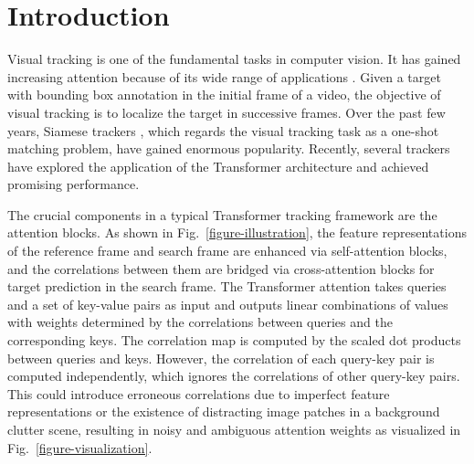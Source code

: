 \section{Introduction}
Visual tracking is one of the fundamental tasks in computer vision. It has gained increasing attention because of its wide range of applications \cite{marvasti2021deep,fiaz2019handcrafted}. Given a target with bounding box annotation in the initial frame of a video, the objective of visual tracking is to localize the target in successive frames. Over the past few years, Siamese trackers \cite{bertinetto2016fully,li2018high,li2019siamrpn++,zhang2020ocean}, which regards the visual tracking task as a one-shot matching problem, have gained enormous popularity. Recently, several trackers \cite{wang2021transformer,chen2021transformer,yu2021high,cao2021hift,yan2021learning,xing2022siamese} have explored the application of the Transformer \cite{vaswani2017attention} architecture and achieved promising performance.

The crucial components in a typical Transformer tracking framework \cite{wang2021transformer,chen2021transformer,yu2021high} are the attention blocks. As shown in Fig.~\ref{figure-illustration}, the feature representations of the reference frame and search frame are enhanced via self-attention blocks, and the correlations between them are bridged via cross-attention blocks for target prediction in the search frame. The Transformer attention \cite{vaswani2017attention} takes queries and a set of key-value pairs as input and outputs linear combinations of values with weights determined by the correlations between queries and the corresponding keys. The correlation map is computed by the scaled dot products between queries and keys. However, the correlation of each query-key pair is computed independently, which ignores the correlations of other query-key pairs. This could introduce erroneous correlations due to imperfect feature representations or the existence of distracting image patches in a background clutter scene, resulting in noisy and ambiguous attention weights as visualized in Fig.~\ref{figure-visualization}.

